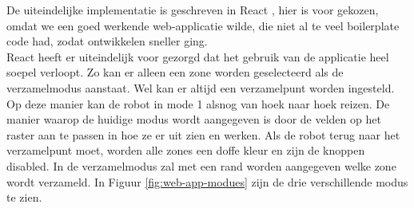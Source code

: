 De uiteindelijke implementatie is geschreven in React \cite{React}, hier is voor gekozen, omdat we een goed werkende web-applicatie wilde, die niet al te veel boilerplate code had, zodat ontwikkelen sneller ging.\\

React heeft er uiteindelijk voor gezorgd dat het gebruik van de applicatie heel soepel verloopt. Zo kan er alleen een zone worden geselecteerd als de verzamelmodus aanstaat. Wel kan er altijd een verzamelpunt worden ingesteld. Op deze manier kan de robot in mode 1 alsnog van hoek naar hoek reizen. De manier waarop de huidige modus wordt aangegeven is door de velden op het raster aan te passen in hoe ze er uit zien en werken. Als de robot terug naar het verzamelpunt moet, worden alle zones een doffe kleur en zijn de knoppen disabled. In de verzamelmodus zal met een rand worden aangegeven welke zone wordt verzameld. In Figuur \ref{fig:web-app-modues} zijn de drie verschillende modus te zien.

